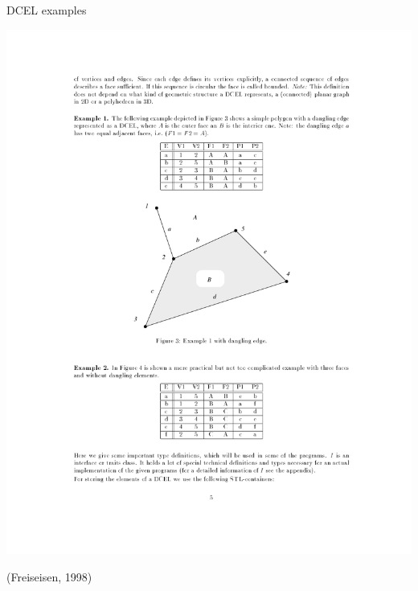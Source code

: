 \documentclass{beamer}
\begin{document}
\begin{frame}{DCEL examples}
\begin{minipage}[t]{0.45\textwidth}
        \includegraphics[clip, trim=8cm 19cm 5cm 6cm,width=1.5\linewidth]{figures/dcel02} 
    \end{minipage}
    \flushright \tiny (Freiseisen, 1998)
\end{frame}
\end{document}
